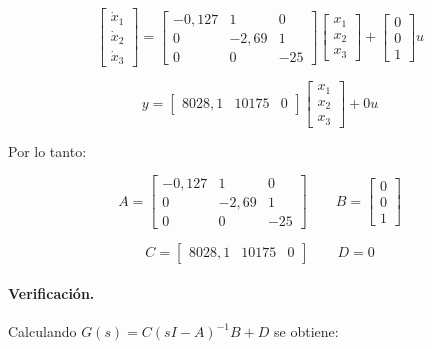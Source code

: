 \documentclass[12pt,a4paper]{article}
\begin{document}
\begin{equation}\begin{bmatrix}\dot{x}_1\\\dot{x}_2\\\dot{x}_3\end{bmatrix}=\begin{bmatrix}-0{,}127&1&0\\0&-2{,}69&1\\0&0&-25\end{bmatrix} \begin{bmatrix}x_1\\x_2\\x_3\end{bmatrix}+\begin{bmatrix}0\\0\\1\end{bmatrix}u\end{equation}

\begin{equation}y=\begin{bmatrix}8028{,}1&10175&0\end{bmatrix} \begin{bmatrix}x_1\\x_2\\x_3\end{bmatrix}+0u\end{equation}

Por lo tanto:

\begin{equation}\boxed{A=\begin{bmatrix}-0{,}127&1&0\\0&-2{,}69&1\\0&0&-25\end{bmatrix} \qquad B=\begin{bmatrix}0\\0\\1\end{bmatrix}}\end{equation}

\begin{equation}\boxed{C=\begin{bmatrix}8028{,}1&10175&0\end{bmatrix} \qquad D=0}\end{equation}
\paragraph{Verificación.} Calculando $G(s)=C(sI-A)^{-1}B+D$ se obtiene:
\end{document}

